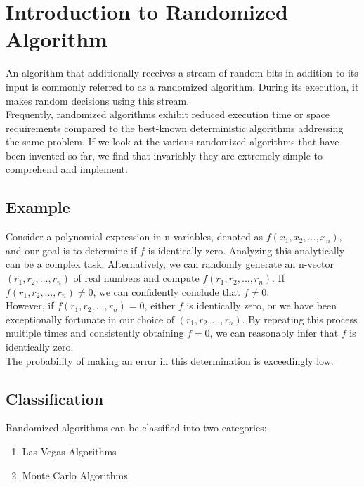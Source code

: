 \documentclass[12pt]{article}
\begin{document}
    \nocite{MITOCWCourse}
    \nocite{MC}
    \nocite{MCS}
    
    
    
    \tableofcontents
    \newpage
    
    \section{Introduction to Randomized Algorithm}
    An algorithm that additionally receives a stream of random bits in addition to its input is commonly referred to as a randomized algorithm. During its execution, it makes random decisions using this stream.\\
    Frequently, randomized algorithms exhibit reduced execution time or space requirements compared to the best-known deterministic algorithms addressing the same problem. If we look at the various randomized algorithms that have been invented so far, we find that invariably they are extremely simple to comprehend and implement.
    \subsection{Example}
    Consider a polynomial expression in n variables, denoted as $f(x_1, x_2,\dots, x_n)$, and our goal is to determine if $f$ is identically zero. Analyzing this analytically can be a complex task. Alternatively, we can randomly generate an n-vector $(r_1, r_2, \dots, r_n)$ of real numbers and compute $f(r_1, r_2, \dots, r_n)$. If $f(r_1, r_2, \dots, r_n) \neq 0$, we can confidently conclude that $f \neq 0$.\\ 
    However, if $f(r_1, r_2, \dots, r_n) = 0$, either $f$ is identically zero, or we have been exceptionally fortunate in our choice of $(r_1, r_2, \dots, r_n)$. By repeating this process multiple times and consistently obtaining $f = 0$, we can reasonably infer that $f$ is identically zero.\\
    The probability of making an error in this determination is exceedingly low.
    \subsection{Classification}
    Randomized algorithms can be classified into two categories:
    \begin{enumerate}
        \item Las Vegas Algorithms
        \item Monte Carlo Algorithms
    \end{enumerate}
\end{document}
